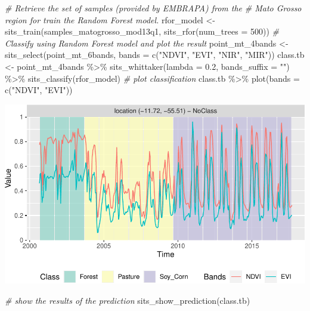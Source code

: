 \documentclass[a4paper,]{tufte-book}
\newenvironment{Shaded}{}{}
\newcommand{\AttributeTok}[1]{\textcolor[rgb]{0.49,0.56,0.16}{#1}}
\newcommand{\CommentTok}[1]{\textcolor[rgb]{0.38,0.63,0.69}{\textit{#1}}}
\newcommand{\DecValTok}[1]{\textcolor[rgb]{0.25,0.63,0.44}{#1}}
\newcommand{\FloatTok}[1]{\textcolor[rgb]{0.25,0.63,0.44}{#1}}
\newcommand{\FunctionTok}[1]{\textcolor[rgb]{0.02,0.16,0.49}{#1}}
\newcommand{\NormalTok}[1]{#1}
\newcommand{\OtherTok}[1]{\textcolor[rgb]{0.00,0.44,0.13}{#1}}
\newcommand{\SpecialCharTok}[1]{\textcolor[rgb]{0.25,0.44,0.63}{#1}}
\newcommand{\StringTok}[1]{\textcolor[rgb]{0.25,0.44,0.63}{#1}}
\begin{document}
\begin{Shaded}
\begin{Highlighting}[]
\CommentTok{\# Retrieve the set of samples (provided by EMBRAPA) from the }
\CommentTok{\# Mato Grosso region for train the Random Forest model.}
\NormalTok{rfor\_model }\OtherTok{\textless{}{-}} \FunctionTok{sits\_train}\NormalTok{(samples\_matogrosso\_mod13q1, }\FunctionTok{sits\_rfor}\NormalTok{(}\AttributeTok{num\_trees =} \DecValTok{500}\NormalTok{))}
\CommentTok{\# Classify using Random Forest model and plot the result}
\NormalTok{point\_mt\_4bands }\OtherTok{\textless{}{-}} \FunctionTok{sits\_select}\NormalTok{(point\_mt\_6bands, }\AttributeTok{bands =} \FunctionTok{c}\NormalTok{(}\StringTok{"NDVI"}\NormalTok{, }\StringTok{"EVI"}\NormalTok{, }\StringTok{"NIR"}\NormalTok{, }\StringTok{"MIR"}\NormalTok{))}
\NormalTok{class.tb }\OtherTok{\textless{}{-}}\NormalTok{ point\_mt\_4bands }\SpecialCharTok{\%\textgreater{}\%} 
    \FunctionTok{sits\_whittaker}\NormalTok{(}\AttributeTok{lambda =} \FloatTok{0.2}\NormalTok{, }\AttributeTok{bands\_suffix =} \StringTok{""}\NormalTok{) }\SpecialCharTok{\%\textgreater{}\%} 
    \FunctionTok{sits\_classify}\NormalTok{(rfor\_model)}
\CommentTok{\# plot classification}
\NormalTok{class.tb }\SpecialCharTok{\%\textgreater{}\%} 
    \FunctionTok{plot}\NormalTok{(}\AttributeTok{bands =} \FunctionTok{c}\NormalTok{(}\StringTok{"NDVI"}\NormalTok{, }\StringTok{"EVI"}\NormalTok{))}
\end{Highlighting}
\end{Shaded}

\begin{center}\includegraphics[width=0.7\linewidth]{sitsbook_files/figure-latex/eval-1} \end{center}

\begin{Shaded}
\begin{Highlighting}[]
\CommentTok{\# show the results of the prediction}
\FunctionTok{sits\_show\_prediction}\NormalTok{(class.tb)}
\end{Highlighting}
\end{Shaded}
\end{document}
